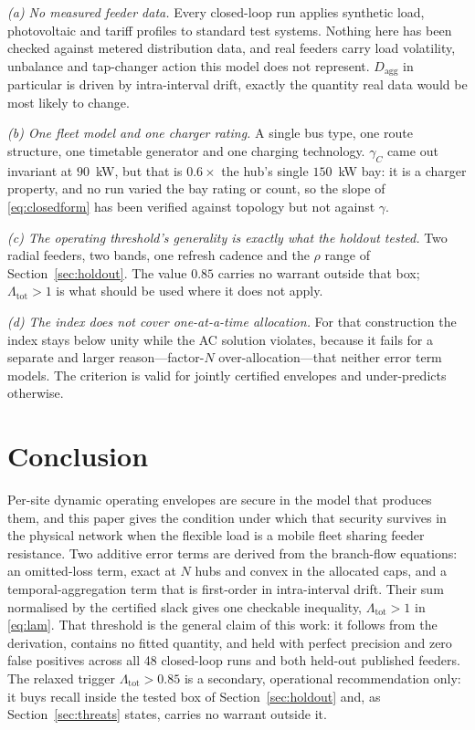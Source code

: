 \documentclass[lettersize,journal]{IEEEtran}
\newcommand{\Dagg}{D_{\mathrm{agg}}}
\newcommand{\Lamt}{\Lambda_{\mathrm{tot}}}
\begin{document}
\emph{(a) No measured feeder data.} Every closed-loop run applies synthetic
load, photovoltaic and tariff profiles to standard test systems. Nothing here
has been checked against metered distribution data, and real feeders carry load
volatility, unbalance and tap-changer action this model does not represent.
$\Dagg$ in particular is driven by intra-interval drift, exactly the quantity
real data would be most likely to change.

\emph{(b) One fleet model and one charger rating.} A single bus type, one route
structure, one timetable generator and one charging technology. $\gamma_C$ came
out invariant at $90$~kW, but that is $0.6\times$ the hub's single $150$~kW
bay: it is a charger property, and no run varied the bay rating or count, so
the slope of \eqref{eq:closedform} has been verified against topology but not
against $\gamma$.

\emph{(c) The operating threshold's generality is exactly what the holdout
tested.} Two radial feeders, two bands, one refresh cadence and the $\rho$
range of Section~\ref{sec:holdout}. The value $0.85$ carries no warrant outside
that box; $\Lamt>1$ is what should be used where it does not apply.

\emph{(d) The index does not cover one-at-a-time allocation.} For that
construction the index stays below unity while the AC solution violates,
because it fails for a separate and larger reason---factor-$N$
over-allocation---that neither error term models. The criterion is valid for
jointly certified envelopes and under-predicts otherwise.

\section{Conclusion}\label{sec:concl}
Per-site dynamic operating envelopes are secure in the model that produces
them, and this paper gives the condition under which that security survives in
the physical network when the flexible load is a mobile fleet sharing feeder
resistance. Two additive error terms are derived from the branch-flow
equations: an omitted-loss term, exact at $N$ hubs and convex in the allocated
caps, and a temporal-aggregation term that is first-order in intra-interval
drift. Their sum normalised by the certified slack gives one checkable
inequality, $\Lamt>1$ in \eqref{eq:lam}. That threshold is the general claim of
this work: it follows from the derivation, contains no fitted quantity, and
held with perfect precision and zero false positives across all 48 closed-loop
runs and both held-out published feeders. The relaxed trigger
$\Lamt>0.85$ is a secondary, operational recommendation only: it buys recall
inside the tested box of Section~\ref{sec:holdout} and, as
Section~\ref{sec:threats} states, carries no warrant outside it.
\end{document}
